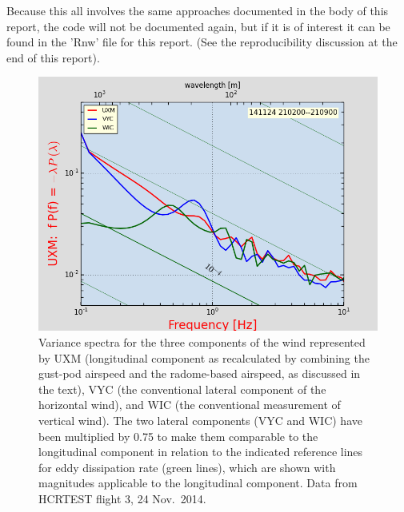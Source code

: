 \documentclass[12pt,twoside,english]{article}\usepackage[]{graphicx}\usepackage[]{color}
\let\OrgIndex\index
\renewcommand*{\index}[1]{\OrgIndex{#1}}
\begin{document}
{{\begin{appendices}
Because this all involves the same approaches documented in the body of this report, the code will not be documented again, but if it is of interest it can be found in the 'Rnw' file for this report. (See the reproducibility discussion at the end of this report). 












\begin{figure}
\noindent \begin{centering}
\includegraphics[height=0.4\textheight]{SpecialGraphics/MEMPlot3Comp.png}  
\par\end{centering}

\protect\caption[Variance spectra for the three components of the wind.]{\label{fig:AppxB-3Comp}Variance spectra for the three components of the wind represented by UXM (longitudinal component as recalculated by combining the gust-pod airspeed and the radome-based airspeed, as discussed in the text), VYC (the conventional lateral component of the horizontal wind), and WIC (the conventional measurement of vertical wind). The two lateral components (VYC and WIC) have been multiplied by 0.75 to make them comparable to the longitudinal component in relation to the indicated reference lines for eddy dissipation rate (green lines), which are shown with magnitudes applicable to the longitudinal component. Data from HCRTEST flight 3, 24 Nov.\ 2014.} 
\end{figure}


\end{appendices}}}
\end{document}
